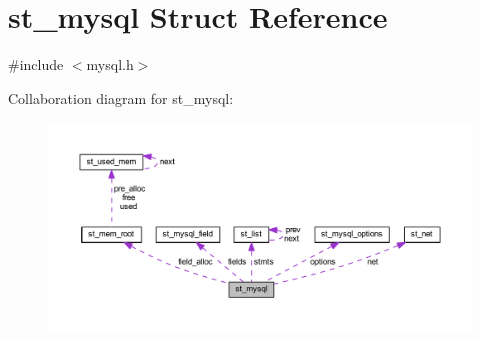 \hypertarget{structst__mysql}{}\section{st\+\_\+mysql Struct Reference}
\label{structst__mysql}


{\ttfamily \#include $<$mysql.\+h$>$}



Collaboration diagram for st\+\_\+mysql\+:\nopagebreak
\begin{figure}[H]
\begin{center}
\leavevmode
\includegraphics[width=350pt]{structst__mysql__coll__graph}
\end{center}
\end{figure}

